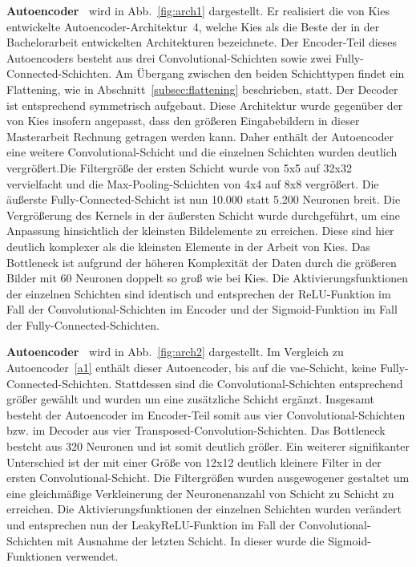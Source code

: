\label{Autoencoder2VAEMediumConvBigKernel}
\textbf{Autoencoder~} wird in Abb.~\ref{fig:arch1} dargestellt. Er realisiert die von Kies~\cite{kiesEntwicklungUndAnalyse2020} entwickelte Autoencoder-Architektur~4, welche Kies als die Beste der in der Bachelorarbeit entwickelten Architekturen bezeichnete. Der Encoder-Teil dieses Autoencoders besteht aus drei Convolutional-Schichten sowie zwei Fully-Connected-Schichten. Am Übergang zwischen den beiden Schichttypen findet ein Flattening, wie in Abschnitt~\ref{subsec:flattening} beschrieben, statt. Der Decoder ist entsprechend symmetrisch aufgebaut. Diese Architektur wurde gegenüber der von Kies insofern angepasst, dass den größeren Eingabebildern in dieser Masterarbeit Rechnung getragen werden kann. Daher enthält der Autoencoder eine weitere Convolutional-Schicht und die einzelnen Schichten wurden deutlich vergrößert.\linebreak Die Filtergröße der ersten Schicht wurde von 5x5 auf 32x32 vervielfacht und die Max-Pooling-Schichten von 4x4 auf 8x8 vergrößert. Die äußerste Fully-Connected-Schicht ist nun 10.000 statt 5.200 Neuronen breit. Die Vergrößerung des Kernels in der äußersten Schicht wurde durchgeführt, um eine Anpassung hinsichtlich der kleinsten Bildelemente zu erreichen. Diese sind hier deutlich komplexer als die kleinsten Elemente in der Arbeit von Kies. Das Bottleneck ist aufgrund der höheren Komplexität der Daten durch die größeren Bilder mit 60 Neuronen doppelt so groß wie bei Kies. Die Aktivierungsfunktionen der einzelnen Schichten sind identisch und entsprechen der ReLU-Funktion im Fall der Convolutional-Schichten im Encoder und der Sigmoid-Funktion im Fall der Fully-Connected-Schichten.

\label{Autoencoder2VAEBigConvNoFully}
\textbf{Autoencoder~} wird in Abb.~\ref{fig:arch2} dargestellt. Im Vergleich zu Autoencoder~\ref{a1} enthält dieser Autoencoder, bis auf die \gls{vae}-Schicht, keine Fully-Connected-Schichten. Stattdessen sind die Convolutional-Schichten entsprechend größer gewählt und wurden um eine zusätzliche Schicht ergänzt. Insgesamt besteht der Autoencoder im Encoder-Teil somit aus vier Convolutional-Schichten bzw. im Decoder aus vier Transposed-Convolution-Schichten. Das Bottleneck besteht aus 320 Neuronen und ist somit deutlich größer. Ein weiterer signifikanter Unterschied ist der mit einer Größe von 12x12 deutlich kleinere Filter in der ersten Convolutional-Schicht. Die Filtergrößen wurden ausgewogener gestaltet um eine gleichmäßige Verkleinerung der Neuronenanzahl von Schicht zu Schicht zu erreichen. Die Aktivierungsfunktionen der einzelnen Schichten wurden verändert und entsprechen nun der LeakyReLU-Funktion im Fall der Convolutional-Schichten mit Ausnahme der letzten Schicht. In dieser wurde die Sigmoid-Funktionen verwendet.


